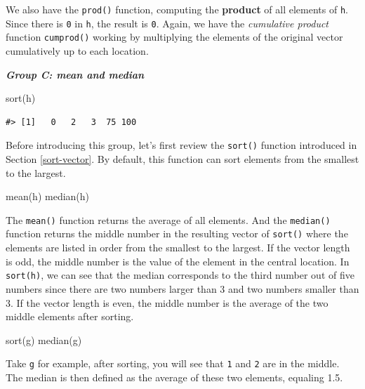 \documentclass[
]{book}
\newenvironment{Shaded}{\begin{snugshade}}{\end{snugshade}}
\newcommand{\FunctionTok}[1]{\textcolor[rgb]{0.00,0.00,0.00}{#1}}
\newcommand{\NormalTok}[1]{#1}
\newenvironment{infobox}[1]
  {
  \begin{itemize}
  \renewcommand{\labelitemi}{
    \raisebox{-.7\height}[0pt][0pt]{
      {\setkeys{Gin}{width=3em,keepaspectratio}
        \texttt{[image: pics/\#1]}}
    }
  }
  \setlength{\fboxsep}{1em}
  \begin{blackbox}
  \item
  }
  {
  \end{blackbox}
  \end{itemize}
  }
\newenvironment{blackbox}{
  \definecolor{shadecolor}{rgb}{0, 0, 0}  %
  \color{white}
  \begin{shaded}}
 {\end{shaded}}
\begin{document}
We also have the \texttt{prod()} function, computing the \textbf{product} of all elements of \texttt{h}. Since there is \texttt{0} in \texttt{h}, the result is \texttt{0}. Again, we have the \emph{cumulative product} function \texttt{cumprod()} working by multiplying the elements of the original vector cumulatively up to each location.

\textbf{\emph{Group C: mean and median}}

\begin{Shaded}
\begin{Highlighting}[]
\FunctionTok{sort}\NormalTok{(h)}
\end{Highlighting}
\end{Shaded}

\begin{verbatim}
#> [1]   0   2   3  75 100
\end{verbatim}

Before introducing this group, let's first review the \texttt{sort()} function introduced in Section \ref{sort-vector}. By default, this function can sort elements from the smallest to the largest.

\begin{Shaded}
\begin{Highlighting}[]
\FunctionTok{mean}\NormalTok{(h)}
\FunctionTok{median}\NormalTok{(h)}
\end{Highlighting}
\end{Shaded}

The \texttt{mean()} function returns the average of all elements. And the \texttt{median()} function returns the middle number in the resulting vector of \texttt{sort()} where the elements are listed in order from the smallest to the largest. If the vector length is odd, the middle number is the value of the element in the central location. In \texttt{sort(h)}, we can see that the median corresponds to the third number out of five numbers since there are two numbers larger than 3 and two numbers smaller than 3. If the vector length is even, the middle number is the average of the two middle elements after sorting.

\begin{infobox}{caution}

\begin{Shaded}
\begin{Highlighting}[]
\FunctionTok{sort}\NormalTok{(g)}
\FunctionTok{median}\NormalTok{(g)}
\end{Highlighting}
\end{Shaded}

Take \texttt{g} for example, after sorting, you will see that \texttt{1} and \texttt{2} are in the middle. The median is then defined as the average of these two elements, equaling 1.5.

\end{infobox}
\end{document}
